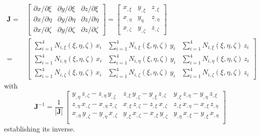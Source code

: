 \begin{equation}
\begin{aligned}
 \mathbf{J}= &
\begin{bmatrix}
\partial x / \partial\xi & \partial y / \partial\xi & \partial z / \partial\xi\\
\partial x / \partial\eta & \partial y / \partial\eta & \partial z / \partial\eta \\
\partial x / \partial\zeta & \partial y / \partial\zeta & \partial z / \partial\zeta 
\end{bmatrix} = \begin{bmatrix} 
    x_{,\xi} & y_{,\xi} & z_{,\xi} \\
    x_{,\eta} & y_{\eta} & z_{,\eta} \\
    x_{,\zeta} & y_{,\zeta} & z_{,\zeta}
\end{bmatrix} \\
  = & \begin{bmatrix}
\sum\nolimits_{i=1}^4 N_{i,\xi} (\xi,\eta,\zeta) \, x_i & \sum\nolimits_{i=1}^4 N_{i,\xi} (\xi,\eta,\zeta) \, y_i &
\sum\nolimits_{i=1}^4 N_{i,\xi} (\xi,\eta,\zeta) \, z_i\\
\sum\nolimits_{i=1}^4 N_{i,\eta} (\xi,\eta,\zeta) \, x_i & \sum\nolimits_{i=1}^4 N_{i,\eta} (\xi,\eta,\zeta) \, y_i &
\sum\nolimits_{i=1}^4 N_{i,\eta} (\xi,\eta,\zeta) \, z_i\\
\sum\nolimits_{i=1}^4 N_{i,\zeta} (\xi,\eta,\zeta) \, x_i & \sum\nolimits_{i=1}^4 N_{i,\zeta} (\xi,\eta,\zeta) \, y_i &
\sum\nolimits_{i=1}^4 N_{i,\zeta} (\xi,\eta,\zeta) \, z_i
\end{bmatrix} 
\end{aligned}
\label{jacobiantet}
\end{equation}
with
\begin{equation}
\mathbf{J}^{-1} = \frac{1}{|\mathbf{J}|} \,
\begin{bmatrix}
y_{,\eta} \, z_{,\zeta} - z_{,\eta} \, y_{,\zeta}  & z_{,\xi} \, y_{,\zeta} - y_{,\xi} \, z_{,\zeta} & y_{,\xi} \, z_{,\eta} - y_{,\eta} \, z_{,\xi} \\
z_{,\eta} \, x_{,\zeta} - x_{,\eta} \, z_{,\zeta}  &  x_{,\xi} \, z_{,\zeta} - z_{,\xi} \, x_{,\zeta} & z_{,\xi} \, x_{,\eta} - x_{,\xi} \, z_{,\eta} \\
 x_{,\eta} \, y_{,\zeta} - y_{,\eta} \, x_{,\zeta}  & y_{,\xi} \, x_{,\zeta} - x_{,\xi} \, y_{,\zeta} & y_{,\eta} \, x_{,\xi} - y_{,\xi} \, x_{,\eta} \\
\end{bmatrix} 
\label{detjacobiantet}
\end{equation}
establishing its inverse.


